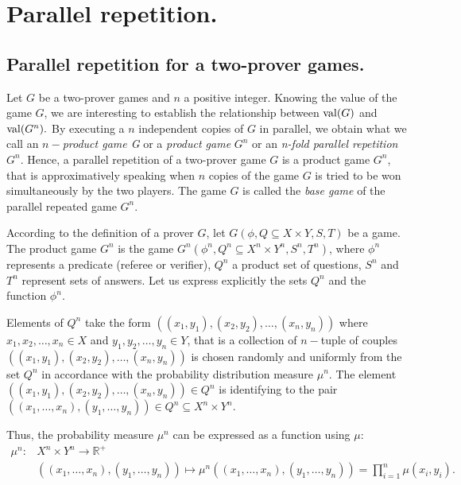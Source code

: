 \section{Parallel repetition.}

\subsection{Parallel repetition for a two-prover games.}

Let $G$ be a two-prover games and $n$ a positive integer. Knowing the value of the game $G$, we are interesting to establish the relationship between $\mathrm{val} (G)$ and $\mathrm{val} (G^n).$  By executing a $n$ independent copies of $G$ in parallel, we obtain what we call an $n-$\textit{product game G} or a \textit{product game} $G^n$ or an \textit{n-fold parallel repetition} $G^n.$ Hence, a parallel repetition of a two-prover game $G$ is a product game $G^n$, that is approximatively speaking when $n$ copies of the game $G$ is tried to be won simultaneously by the two players. The game $G$ is called  the \textit{base game} of the parallel repeated game $G^n.$

According to the definition of a prover $G$, let $G(\phi, Q \subseteq X \times Y, S, T)$ be a game. The product game $G^n$ is the game $G^n(\phi^n, Q^n\subseteq X^n \times Y^n, S^n, T^n)$, where $\phi^n$ represents a predicate (referee or verifier), $Q^n$ a product set of questions, $S^n$ and $T^n$ represent sets of answers. Let us express explicitly the sets $Q^n$ and the function $\phi^n.$

 Elements of $Q^n$ take the form $((x_1, y_1),(x_2,y_2 ), \ldots, (x_n, y_n))$ where $x_1, x_2, \ldots, x_n \in X$ and $y_1, y_2, \ldots, y_n \in Y$, that is a collection of $n-$tuple of couples  $((x_1, y_1),(x_2,y_2 ), \ldots, (x_n, y_n))$ is chosen randomly and uniformly from the set $Q^n$ in accordance with the probability distribution measure $\mu^n $. The element  $((x_1, y_1),(x_2,y_2 ), \ldots, (x_n, y_n)) \in Q^n$ is identifying to the pair $((x_1,\ldots, x_n), (y_1, \ldots, y_n)) \in Q^n \subseteq X^n \times Y^n.$
 
Thus, the probability measure $\mu^n$ can be expressed as a function using $\mu$: 
 \begin{align*}
\mu^n:  & X^n \times Y^n  \longrightarrow \mathbb{R}^+ \\
  & ((x_1,\ldots, x_n), (y_1,\ldots, y_n)) \longmapsto \mu^n((x_1,\ldots, x_n), (y_1,\ldots, y_n))=\prod_{i=1}^n  \mu (x_i, y_i). 
 \end{align*}
 
